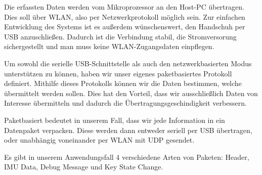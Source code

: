 Die erfassten Daten werden vom Mikroprozessor an den Host-PC übertragen. Dies
soll über WLAN, also per Netzwerkprotokoll möglich sein. Zur einfachen
Entwicklung des Systems ist es außerdem wünschenswert, den Handschuh per USB
anzuschließen. Dadurch ist die Verbindung stabil, die Stromversorung
sichergestellt und man muss keine WLAN-Zugangsdaten einpflegen.

Um sowohl die serielle USB-Schnittstelle als auch den netzwerkbasierten Modus
unterstützen zu können, haben wir unser eigenes paketbasiertes Protokoll definiert.
Mithilfe dieses Protokolls können wir die Daten bestimmen, welche übermittelt
werden sollen. Dies hat den Vorteil, dass wir ausschließlich Daten von
Interesse übermitteln und dadurch die Übertragungsgeschindigkeit verbessern.

Paketbasiert bedeutet in unserem Fall, dass wir jede Information in ein
Datenpaket verpacken. Diese werden dann entweder seriell per USB übertragen,
oder unabhängig voneinander per WLAN mit UDP gesendet.

Es gibt in unserem Anwendungsfall 4 verschiedene Arten von Paketen: Header,
IMU Data, Debug Message und Key State Change.

